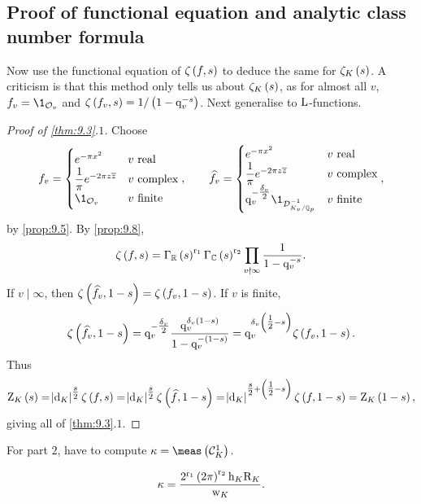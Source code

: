 \subsection{Proof of functional equation and analytic class number formula}

Now use the functional equation of $ \zeta\br{f, s} $ to deduce the same for $ \zeta_K\br{s} $. A criticism is that this method only tells us about $ \zeta_K\br{s} $, as for almost all $ v $, $ f_v = \1_{\OOO_v} $ and $ \zeta\br{f_v, s} = 1 / \br{1 - \q_v^{-s}} $. Next generalise to $ \mathrm{L} $-functions.

\begin{proof}[Proof of \ref{thm:9.3}.$ 1 $]
Choose
$$ f_v =
\begin{cases}
e^{-\pi x^2} & v \ \text{real} \\
\dfrac{1}{\pi}e^{-2\pi z\overline{z}} & v \ \text{complex} \\
\1_{\OOO_v} & v \ \text{finite}
\end{cases},
\qquad \widehat{f_v} =
\begin{cases}
e^{-\pi x^2} & v \ \text{real} \\
\dfrac{1}{\pi}e^{-2\pi z\overline{z}} & v \ \text{complex} \\
\q_v^{-\tfrac{\delta_v}{2}}\1_{\DDD_{K_v / \QQ_p}^{-1}} & v \ \text{finite}
\end{cases},
$$
by \ref{prop:9.5}. By \ref{prop:9.8},
$$ \zeta\br{f, s} = \Gamma_\RR\br{s}^{\r_1}\Gamma_\CC\br{s}^{\r_2}\prod_{v \nmid \infty} \dfrac{1}{1 - \q_v^{-s}}. $$
If $ v \mid \infty $, then $ \zeta\br{\widehat{f_v}, 1 - s} = \zeta\br{f_v, 1 - s} $. If $ v $ is finite,
$$ \zeta\br{\widehat{f_v}, 1 - s} = \q_v^{-\tfrac{\delta_v}{2}}\dfrac{\q_v^{\delta_v\br{1 - s}}}{1 - \q_v^{-\br{1 - s}}} = \q_v^{\delta_v\br{\tfrac{1}{2} - s}}\zeta\br{f_v, 1 - s}. $$
Thus
$$ \Z_K\br{s} = \abs{\d_K}^{\tfrac{s}{2}}\zeta\br{f, s} = \abs{\d_K}^{\tfrac{s}{2}}\zeta\br{\widehat{f}, 1 - s} = \abs{\d_K}^{\tfrac{s}{2} + \br{\tfrac{1}{2} - s}}\zeta\br{f, 1 - s} = \Z_K\br{1 - s}, $$
giving all of \ref{thm:9.3}.$ 1 $.
\end{proof}

\pagebreak

For part $ 2 $, have to compute $ \kappa = \meas\br{\CCC_K^1} $.


\begin{theorem}
\label{thm:9.16}
$$ \kappa = \dfrac{2^{\r_1}\br{2\pi}^{\r_2}\h_K\R_K}{\w_K}. $$
\end{theorem}

